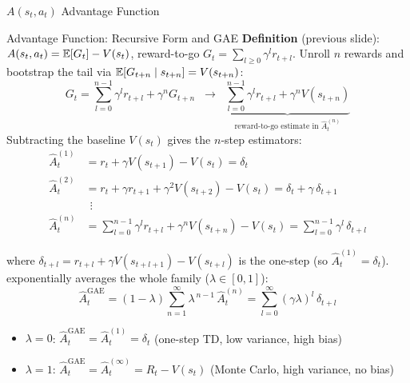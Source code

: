 \begin{frame}{$A(s_t, a_t)$ Advantage Function}
\begin{center}
  \end{center}
\end{frame}

\begin{frame}{Advantage Function: Recursive Form and GAE}
  \small
  \textbf{Definition} (previous slide): $A(s_t,a_t) = \mathbb{E}[G_t] - V(s_t)$, reward-to-go $G_t = \sum_{l\ge 0}\gamma^l r_{t+l}$.
  Unroll $n$ rewards and bootstrap the tail via $\mathbb{E}[G_{t+n}\mid s_{t+n}] = V(s_{t+n})$:
  \[
    G_t = \sum_{l=0}^{n-1}\gamma^l r_{t+l} + \gamma^n G_{t+n}
    \;\;\longrightarrow\;\;
    \underbrace{\sum_{l=0}^{n-1}\gamma^l r_{t+l} + \gamma^n V(s_{t+n})}_{\text{reward-to-go estimate in } \hat{A}_t^{(n)}}
  \]
  Subtracting the baseline $V(s_t)$ gives the $n$-step estimators:
  \vspace{-0.2em}
  \begin{align*}
    \hat{A}_t^{(1)} &= r_t + \gamma V(s_{t+1}) - V(s_t) = \delta_t \\
    \hat{A}_t^{(2)} &= r_t + \gamma r_{t+1} + \gamma^2 V(s_{t+2}) - V(s_t) = \delta_t + \gamma\, \delta_{t+1} \\
                    &\ \ \vdots \\
    \hat{A}_t^{(n)} &= \sum_{l=0}^{n-1} \gamma^l r_{t+l} + \gamma^n V(s_{t+n}) - V(s_t) = \sum_{l=0}^{n-1} \gamma^l\, \delta_{t+l}
  \end{align*}

  where $\delta_{t+l} = r_{t+l} + \gamma V(s_{t+l+1}) - V(s_{t+l})$ is the one-step  (so $\hat{A}_t^{(1)} = \delta_t$).  exponentially averages the whole family ($\lambda \in [0,1]$):
  \[
    \hat{A}_t^{\text{GAE}} = (1-\lambda)\sum_{n=1}^{\infty} \lambda^{\,n-1}\, \hat{A}_t^{(n)} = \sum_{l=0}^{\infty} (\gamma \lambda)^l \, \delta_{t+l}
  \]
  \begin{itemize}[nosep]
    \item $\lambda = 0$: $\hat{A}_t^{\text{GAE}} = \hat{A}_t^{(1)} = \delta_t$ (one-step TD, low variance, high bias)
    \item $\lambda = 1$: $\hat{A}_t^{\text{GAE}} = \hat{A}_t^{(\infty)} = R_t - V(s_t)$ (Monte Carlo, high variance, no bias)
  \end{itemize}
\end{frame}

